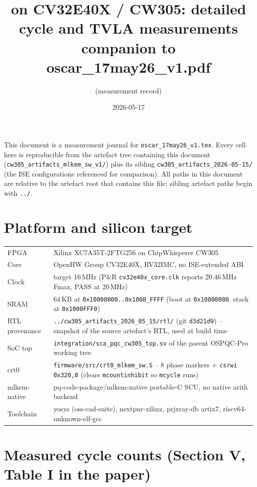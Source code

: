 \documentclass[11pt]{article}
\title{\mlkem{} on CV32E40X / CW305: detailed cycle and TVLA measurements\\
\large companion to oscar\_17may26\_v1.pdf}
\date{2026-05-17}
\author{(measurement record)}
\newcommand{\swart}{}                              %
\newcommand{\isert}{../cw305\_artifacts\_2026\_05\_15}
\begin{document}
\maketitle

This document is a measurement journal for \texttt{oscar\_17may26\_v1.tex}.
Every cell here is reproducible from the artefact tree containing this
document (\texttt{cw305\_artifacts\_mlkem\_sw\_v1/}) plus its sibling
\texttt{cw305\_artifacts\_2026-05-15/} (the ISE configurations referenced
for comparison). All paths in this document are relative to the artefact
root that contains this file; sibling artefact paths begin with \texttt{../}.

\section{Platform and silicon target}

\begin{tabularx}{\linewidth}{@{}lX@{}}
\toprule
FPGA            & Xilinx XC7A35T-2FTG256 on ChipWhisperer CW305 \\
Core            & OpenHW Group CV32E40X, RV32IMC, no ISE-extended ABI \\
Clock           & target 16\,MHz (P\&R \texttt{cv32e40x\_core.clk} reports 20.46\,MHz Fmax, PASS at 20\,MHz) \\
SRAM            & 64\,KB at \texttt{0x10000000..0x1000\_FFFF} (boot at \texttt{0x10000080}, stack at \texttt{0x1000FFF0}) \\
RTL provenance  & \texttt{\isert{}/rtl/} (git \texttt{d3d21d9}) -- snapshot of the source artefact's RTL, used at build time \\
SoC top         & \texttt{integration/sca\_pqc\_cw305\_top.sv} of the parent OSPQC-Pro working tree \\
crt0            & \texttt{\swart{}firmware/src/crt0\_mlkem\_sw.S} -- 8 phase markers + \texttt{csrwi 0x320,0} (clears \texttt{mcountinhibit} so \texttt{mcycle} runs) \\
mlkem-native    & pq-code-package/mlkem-native portable-C SCU, no native arith backend \\
Toolchain       & yosys (oss-cad-suite), nextpnr-xilinx, prjxray-db artix7, riscv64-unknown-elf-gcc \\
\bottomrule
\end{tabularx}

\section{Measured cycle counts (Section V, Table I in the paper)}
\end{document}
